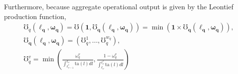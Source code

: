\documentclass[hidelinks, nonatbib]{elsarticle}
\begin{document}
\begin{enumerate}
    Furthermore, because aggregate operational output is given by the Leontief production function,
    \begin{gather}
        \mho_{q}(
            \boldsymbol{\ell_{q}}
            ,\boldsymbol{\omega_{q}}
        )
        =
        \mho(
            \boldsymbol{1},
            \boldsymbol{\mho_q}(
                \boldsymbol{\ell_{q}}
                ,\boldsymbol{\omega_{q}}
            )
        )
        =
        \min(
            \boldsymbol{1}
            \times
            \boldsymbol{\mho_q}(
                \boldsymbol{\ell_{q}}
                ,\boldsymbol{\omega_{q}}
            )
        )
        ,
        \\
        \boldsymbol{\mho_q}(
            \boldsymbol{\ell_{q}}
            ,\boldsymbol{\omega_{q}}
        )
        =
        (
            \mho_{q}^{1}
            ,
            \dots
            ,
            \mho_{q}^{w_q}
        )
        ,
        \\
        \mho_{q}^{v} = 
        \min
        \left(
                \frac{
                    \omega_{q}^{v}
                }{
                    \int_{\ell_{v-1}^{*}}^{\ell_v}{
                        \text{ta}(l)dl
                    }
                }
                ,
                \frac{
                    1 - \omega_{q}^{v}
                }{
                    \int_{\ell_v}^{\ell_{v}^{*}}{
                        \text{ta}(l)dl
                    }
                }
            \right)

\end{gather}
\end{enumerate}
\end{document}
